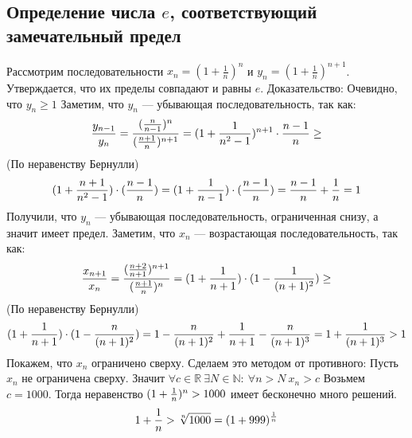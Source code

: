\subsection{Определение числа $e$, соответствующий замечательный предел}
    Рассмотрим последовательности $x_n = (1 + \frac{1}{n})^n$ и $y_n = (1 + \frac{1}{n})^{n+1}$. Утверждается, что их пределы совпадают и равны $e$.
    \newline
    \newline
    Доказательство:
    \newline
    \newline
    Очевидно, что $y_n \geq 1$
    \newline
    Заметим, что $y_n$ --- убывающая последовательность, так как:
    \newline
    $${y_{n-1} \over y_n} = {({n \over n-1})^n \over ({n+1 \over n})^{n+1}} = (1 + {1 \over n^2-1})^{n+1} \cdot {n-1 \over n} \geq$$
    \newline
    (По неравенству Бернулли)
    \newline
    $$(1 + {n+1 \over n^2-1}) \cdot ({n-1 \over n}) = (1 + {1 \over n-1}) \cdot ({n-1 \over n}) = {n-1 \over n} + {1 \over n} = 1$$
    \newline
    Получили, что $y_n$ --- убывающая последовательность, ограниченная снизу, а значит имеет предел.
    \newline
    \newline
    Заметим, что $x_n$ --- возрастающая последовательность, так как:
    \newline
    $${x_{n+1} \over x_n} = {({n+2 \over n+1})^{n+1} \over ({n+1 \over n})^n} = (1 + {1 \over n+1}) \cdot (1 - {1 \over (n+1)^2}) \geq$$
    \newline
    (По неравенству Бернулли)
    \newline
    $$(1 + {1 \over n+1}) \cdot (1 - {n \over (n+1)^2}) = 1 - {n \over (n+1)^2} + {1 \over n+1} - {n \over (n+1)^3} = 1 + {1 \over (n+1)^3} > 1$$
    \newline
    Покажем, что $x_n$ ограничено сверху. Сделаем это методом от противного:
    \newline
    Пусть $x_n$ не ограничена сверху. Значит $\forall c \in \mathbb{R} \ \exists N \in \mathbb{N} : \ \forall n > N \ x_n > c$
    \newline
    Возьмем $c = 1000$. Тогда неравенство $(1 + {1 \over n})^n > 1000$ имеет бесконечно много решений.
    \newline
    $$1 + {1 \over n} > \sqrt[n]{1000} = (1 + 999)^{1 \over n}$$

